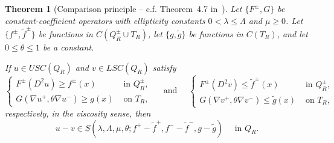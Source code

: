 \documentclass[letter,11pt]{amsart}
\newcommand{\uppers}{USC}
\newcommand{\lowers}{LSC}
\newtheorem{thm}{Theorem}[section]
\theoremstyle{definition}
\numberwithin{equation}{section}
\begin{document}
\begin{thm}[Comparison principle -- c.f. Theorem~4.7 in~\cite{SS}]
\label{thm:comp}
Let $\{F^{\pm},G\}$ be constant-coefficient operators with ellipticity constants $0 < \lambda \leq \Lambda$ and $\mu \geq 0$.
Let $\{f^{\pm}, \widetilde{f}^{\pm}\}$ be functions in $C(Q^{\pm}_R \cup T_R)$, let $\{g, \widetilde{g}\}$ be functions in $C(T_R)$, and let $0 \leq \theta \leq 1$ be a constant.

If $u \in \uppers(Q_R)$ and $v \in \lowers(Q_R)$ satisfy
\[
\begin{cases}
F^{\pm}(D^2 u) \geq f^{\pm}(x) & \text{ in } Q_R^{\pm},\\
G(\nabla u^{+}, \theta \nabla u^{-}) \geq g(x) & \text{ on } T_R,
\end{cases}
\quad \text{ and } \quad
\begin{cases}
F^{\pm}(D^2 v) \leq \widetilde{f}^{\pm}(x) & \text{ in } Q_R^{\pm},\\
G(\nabla v^{+}, \theta \nabla v^{-}) \leq \widetilde{g}(x) & \text{ on } T_R,
\end{cases}
\]
respectively, in the viscosity sense, then
\[
u - v \in \underline{S}(\lambda,\Lambda,\mu,\theta; f^{+} - \widetilde{f}^{+}, f^{-} - \widetilde{f}^{-}, g - \widetilde{g}) \quad \text{ in } Q_R.
\]
\end{thm}
\end{document}
